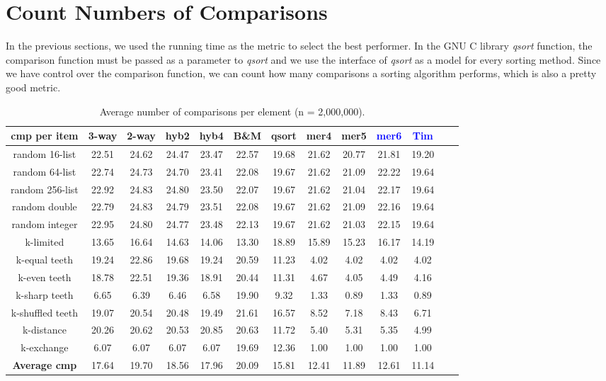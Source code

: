\documentclass[AMA,STIX1COL]{WileyNJD-v2}
\newcommand{\qsort}{\emph{qsort }}
\newcommand{\qsortn}{\emph{qsort}}
\begin{document}
\section{Count Numbers of Comparisons} 
In the previous sections, we used the running time as the metric to select the best performer. 
In the GNU C library \qsort function, the comparison function must be passed as a parameter to \qsort and we use the interface of \qsort as a model for every sorting method. 
Since we have control over the comparison function, we can count how many comparisons a sorting algorithm performs, which is also a pretty good metric.


\begin{table}
\caption{Average number of comparisons per element (n = 2,000,000).}
\centering
\begin{tabular}{|c|c|c|c|c|c|c|c|c|c|c|c|c|}
\toprule
cmp per item & 3-way & 2-way & hyb2 & hyb4 & B\&M& qsort & mer4 & mer5 & \textcolor{blue}{mer6}  & \textcolor{blue}{Tim}\\
\midrule
random 16-list	&22.51	&24.62&	24.47&	23.47&	22.57&	19.68&	21.62&	20.77&	21.81&	19.20\\
random 64-list&	22.74	&24.73	&24.70	&23.41	&22.08	&19.67	&21.62	&21.09	&22.22	&19.64\\
random 256-list&	22.92&	24.83&	24.80&	23.50&	22.07&	19.67&	21.62&	21.04&	22.17&	19.64\\
random double&	22.79	&24.83	&24.79	&23.51	&22.08	&19.67	&21.62	&21.09	&22.16	&19.64\\
random integer&	22.95	&24.80	&24.77	&23.48	&22.13	&19.67	&21.62	&21.03	&22.15	&19.64\\
k-limited&	13.65	&16.64&	14.63&	14.06&	13.30&	18.89&	15.89&	15.23&	16.17&	14.19\\
k-equal teeth&	19.24	&22.86	&19.68	&19.24	&20.59	&11.23	&4.02	&4.02	&4.02	&4.02\\
k-even teeth&	18.78&	22.51&	19.36&	18.91&	20.44&	11.31&	4.67&	4.05&	4.49&	4.16\\
k-sharp teeth&	6.65	&6.39	&6.46	&6.58	&19.90	&9.32	&1.33	&0.89	&1.33	&0.89\\
k-shuffled teeth&	19.07&	20.54&	20.48&	19.49&	21.61&	16.57&	8.52&	7.18&	8.43&	6.71\\
k-distance&	20.26	&20.62	&20.53	&20.85	&20.63	&11.72	&5.40	&5.31	&5.35&	4.99\\
k-exchange&	6.07&	6.07&	6.07&	6.07&	19.69&	12.36&	1.00&	1.00&	1.00&	1.00\\
\textbf{Average  cmp}&	17.64	&19.70	&18.56	&17.96	&20.09	&15.81	&12.41	&11.89	&12.61	&11.14\\
\bottomrule
\end{tabular}
\label{table4}
\end{table}
\end{document}
